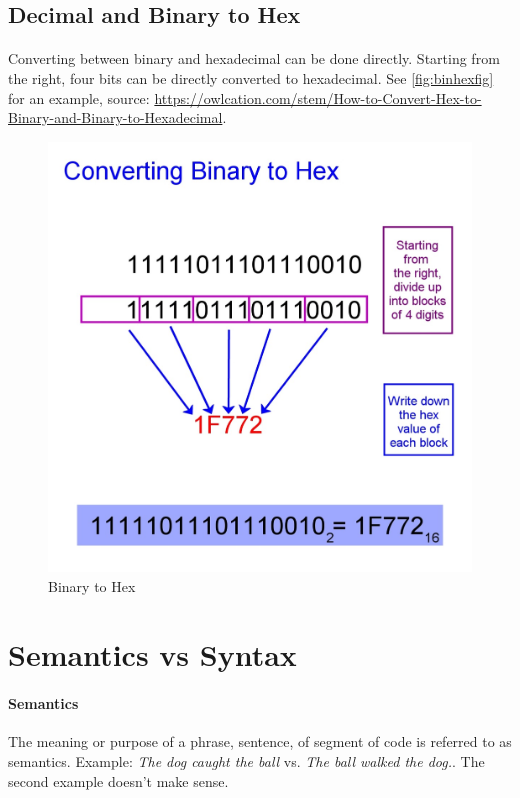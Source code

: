 \documentclass[letter,11pt]{article}
\begin{document}
\subsection{Decimal and Binary to Hex}
\paragraph{}Converting between binary and hexadecimal can be done directly. Starting from the right, four bits can be directly converted to hexadecimal. See \autoref{fig:binhexfig} for an example, source: \url{https://owlcation.com/stem/How-to-Convert-Hex-to-Binary-and-Binary-to-Hexadecimal}.

\begin{figure}[h!]
    \centering
    \includegraphics[scale=0.31]{FinalExam/bin_hex.jpg}
    \caption{Binary to Hex}
    \label{fig:binhexfig}
\end{figure}
\FloatBarrier

\section{Semantics vs Syntax}
\paragraph{Semantics} The meaning or purpose of a phrase, sentence, of segment of code is referred to as semantics. Example: \textit{The dog caught the ball} vs. \textit{The ball walked the dog.}. The second example doesn't make sense.
\end{document}

